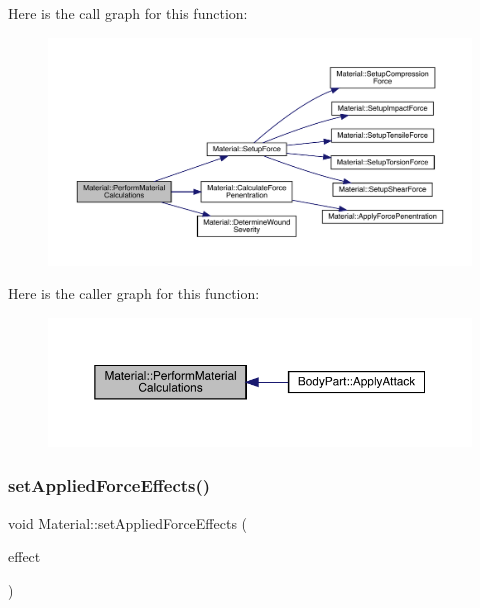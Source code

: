 Here is the call graph for this function\+:
\nopagebreak
\begin{figure}[H]
\begin{center}
\leavevmode
\includegraphics[width=350pt]{dc/dee/class_material_a9340d9854962d09d685b9638be093fa5_cgraph}
\end{center}
\end{figure}
Here is the caller graph for this function\+:
\nopagebreak
\begin{figure}[H]
\begin{center}
\leavevmode
\includegraphics[width=350pt]{dc/dee/class_material_a9340d9854962d09d685b9638be093fa5_icgraph}
\end{center}
\end{figure}
\mbox{\label{class_material_a0d32999bbe6a954cee51da67f78d5c51}} 
\subsubsection{\texorpdfstring{set\+Applied\+Force\+Effects()}{setAppliedForceEffects()}}
{\footnotesize\ttfamily void Material\+::set\+Applied\+Force\+Effects (\begin{DoxyParamCaption}\item[{\mbox{\hyperlink{struct_applied_force_effect}{Applied\+Force\+Effect}}}]{effect }\end{DoxyParamCaption})}

